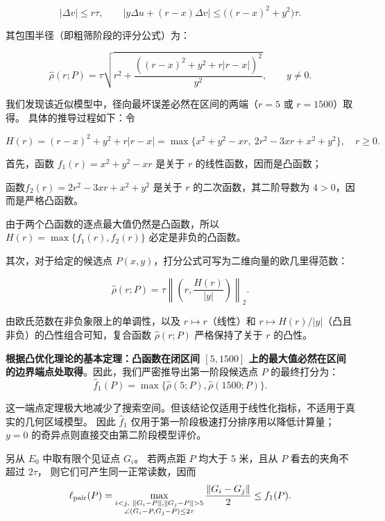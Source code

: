 \documentclass[withoutpreface,bwprint]{cumcmthesis} %
\begin{document}
\begin{equation*}
|\Delta v|\le r\tau,\qquad
|y\Delta u+(r-x)\Delta v|\le\bigl((r-x)^2+y^2\bigr)\tau .
\end{equation*}

其包围半径（即粗筛阶段的评分公式）为：

\begin{equation}
\widehat\rho(r;P)=\tau
\sqrt{r^2+\frac{\left((r-x)^2+y^2+r|r-x|\right)^2}{y^2}},
\qquad y\ne0.
\label{eq:q2surrogate}
\end{equation}

我们发现该近似模型中，径向最坏误差必然在区间的两端（$r=5$ 或 $r=1500$）取得。
具体的推导过程如下：令

\[
H(r)=(r-x)^2+y^2+r|r-x|
=\max\{x^2+y^2-xr,\ 2r^2-3xr+x^2+y^2\},\quad r\ge0.
\]

首先，函数 $f_1(r) = x^2+y^2-xr$ 是关于 $r$ 的线性函数，因而是凸函数；

函数$f_2(r) = 2r^2-3xr+x^2+y^2$ 是关于 $r$ 的二次函数，其二阶导数为 $4 > 0$，因而是严格凸函数。

由于两个凸函数的逐点最大值仍然是凸函数，所以 $H(r) = \max\{f_1(r), f_2(r)\}$ 必定是非负的凸函数。

其次，对于给定的候选点 $P(x,y)$，打分公式可写为二维向量的欧几里得范数：

\begin{equation}
\widehat\rho(r;P)=\tau \left\| \left( r, \frac{H(r)}{|y|} \right) \right\|_2.
\end{equation}

由欧氏范数在非负象限上的单调性，以及 $r \mapsto r$（线性）和 $r \mapsto H(r)/|y|$（凸且非负）的凸性组合可知，复合函数 $\widehat\rho(r;P)$ 严格保持了关于 $r$ 的凸性。

\textbf{根据凸优化理论的基本定理：凸函数在闭区间 $[5, 1500]$ 上的最大值必然在区间的边界端点处取得}。因此，我们严密推导出第一阶段候选点 $P$ 的最终打分为：
\begin{equation}
\widehat f_1(P)=\max\{\widehat\rho(5;P),\widehat\rho(1500;P)\}.
\end{equation}

这一端点定理极大地减少了搜索空间。但该结论仅适用于线性化指标，不适用于真实的几何区域模型。
因此 $\widehat f_1$ 仅用于第一阶段极速打分排序用以降低计算量；$y=0$ 的奇异点则直接交由第二阶段模型评价。

另从 $E_0$ 中取有限个见证点 $G_i$。
若两点距 $P$ 均大于 $5$ 米，且从 $P$ 看去的夹角不超过 $2\tau$，
则它们可产生同一正常读数，因而
\begin{equation}
\ell_{\rm pair}(P)=
\max_{\substack{i<j,\ \|G_i-P\|,\|G_j-P\|>5\\
\angle(G_i-P,G_j-P)\le2\tau}}
\frac{\|G_i-G_j\|}{2}\le f_1(P).
\end{equation}
\end{document}
